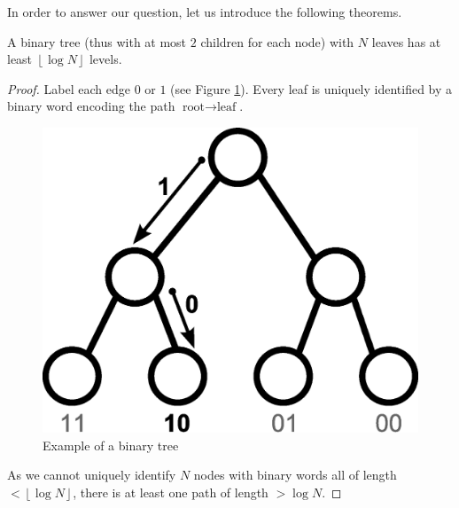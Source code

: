 In order to answer our question, let us introduce the following theorems.\\

\begin{theorem}
A binary tree (thus with at most $2$ children for each node) with $N$ leaves has at least $\left\lfloor \log N \right\rfloor$ levels.
\end{theorem}
\begin{proof}
Label each edge $0$ or $1$ (see Figure \ref{tree6}). Every leaf is uniquely identified by a binary word encoding the path $\text{root} \rightarrow \text{leaf}$.\\
\begin{figure}[htbp]
\centering
\includegraphics[scale=0.5]{images/CM2/tree6.eps}
\caption{Example of a binary tree}
\label{tree6}
\end{figure}
As we cannot uniquely identify $N$ nodes with binary words all of length $< \left\lfloor \log N \right\rfloor$, there is at least one path of length $> \log N$.

\end{proof}

